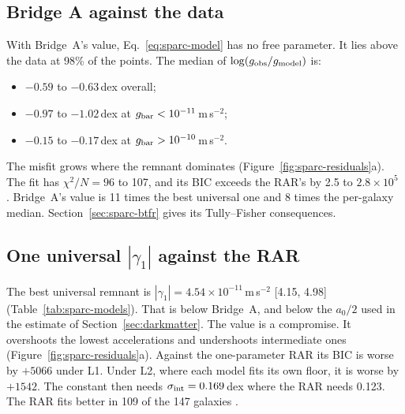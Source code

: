 \subsection{Bridge A against the data}\label{sec:sparc-bridgea}

With Bridge~A's value, Eq.~\eqref{eq:sparc-model} has no free parameter. It lies above the data at 98\% of the points. The median of
$\log(g_{\rm obs}/g_{\rm model})$ is:
\begin{itemize}[nosep]
\item $-0.59$ to $-0.63$\,dex overall;
\item $-0.97$ to $-1.02$\,dex at $g_{\rm bar}<10^{-11}$\,m\,s$^{-2}$;
\item $-0.15$ to $-0.17$\,dex at $g_{\rm bar}>10^{-10}$\,m\,s$^{-2}$.
\end{itemize}
The misfit grows where the remnant dominates (Figure~\ref{fig:sparc-residuals}a). The fit has $\chi^2/N=96$ to 107, and its BIC exceeds
the RAR's by 2.5 to $2.8\times10^5$ . Bridge~A's value is 11 times the best universal one and 8 times the per-galaxy
median. Section~\ref{sec:sparc-btfr} gives its Tully--Fisher consequences.

\subsection{One universal \texorpdfstring{$|\gamma_1|$}{|gamma1|} against the RAR}\label{sec:sparc-universal}

The best universal remnant is $|\gamma_1|=4.54\times10^{-11}$\,m\,s$^{-2}$ [4.15, 4.98] (Table~\ref{tab:sparc-models}). That is below
Bridge~A, and below the $a_0/2$ used in the estimate of Section~\ref{sec:darkmatter}. The value is a compromise. It overshoots the lowest
accelerations and undershoots intermediate ones (Figure~\ref{fig:sparc-residuals}a). Against the one-parameter RAR its BIC is worse by
$+5066$ under L1. Under L2, where each model fits its own floor, it is worse by $+1542$. The constant then needs
$\sigma_{\rm int}=0.169$\,dex where the RAR needs 0.123. The RAR fits better in 109 of the 147 galaxies .

